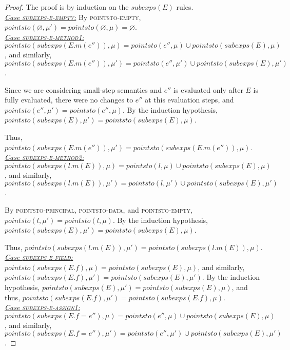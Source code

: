 \documentclass{llncs}
\begin{document}
\begin{proof} The proof is by induction on the $subexps(E)$ rules.\\

\noindent\underline{\textit{Case \textsc{subexps-e-empty}:}} By \textsc{pointsto-empty}, $pointsto(\varnothing, \mu') = pointsto(\varnothing, \mu) = \varnothing$.\\

\noindent\underline{\textit{Case \textsc{subexps-e-method1}:}} $pointsto(subexps(E.m(e'')), \mu) = pointsto(e'', \mu) \cup pointsto(subexps(E), \mu)$, and similarly, $pointsto(subexps(E.m(e'')), \mu') = pointsto(e'', \mu') \cup pointsto(subexps(E), \mu')$.

Since we are considering small-step semantics and $e''$ is evaluated only after $E$ is fully evaluated, there were no changes to $e''$ at this evaluation steps, and $pointsto(e'', \mu') = pointsto(e'', \mu)$. By the induction hypothesis, $pointsto(subexps(E), \mu') = pointsto(subexps(E), \mu)$.

Thus, $pointsto(subexps(E.m(e'')), \mu') =pointsto(subexps(E.m(e'')), \mu)$.\\

\noindent\underline{\textit{Case \textsc{subexps-e-method2}:}} $pointsto(subexps(l.m(E)), \mu) = pointsto(l, \mu) \cup pointsto(subexps(E), \mu)$, and similarly, $pointsto(subexps(l.m(E)), \mu') = pointsto(l, \mu') \cup pointsto(subexps(E), \mu')$.

By \textsc{pointsto-principal}, \textsc{pointsto-data}, and \textsc{pointsto-empty}, $pointsto(l, \mu') = pointsto(l, \mu)$. By the induction hypothesis, $pointsto(subexps(E), \mu') = pointsto(subexps(E), \mu)$.

Thus, $pointsto(subexps(l.m(E)), \mu') =pointsto(subexps(l.m(E)), \mu)$.\\

\noindent\underline{\textit{Case \textsc{subexps-e-field}:}} $pointsto(subexps(E.f), \mu) = pointsto(subexps(E), \mu)$, and similarly,\\
$pointsto(subexps(E.f), \mu') = pointsto(subexps(E), \mu')$. By the induction hypothesis, $pointsto(subexps(E), \mu') = pointsto(subexps(E), \mu)$, and thus, $pointsto(subexps(E.f), \mu') =pointsto(subexps(E.f), \mu)$.\\

\noindent\underline{\textit{Case \textsc{subexps-e-assign1}:}} $pointsto(subexps(E.f = e''), \mu) = pointsto(e'', \mu) \cup pointsto(subexps(E), \mu)$, and similarly, $pointsto(subexps(E.f = e''), \mu') = pointsto(e'', \mu') \cup pointsto(subexps(E), \mu')$.


\end{proof}
\end{document}
